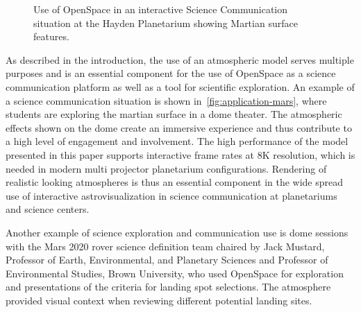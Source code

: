 \documentclass[journal]{vgtc}                %
\newcommand{\anderscomment}[1]{\textbf{[AY~} \textcolor{cyan}{#1} \textbf{~]}}
\newcommand{\chuckcomment}[1]{\textbf{[CH~} \textcolor{green}{#1} \textbf{~]}}
\begin{document}
\begin{figure}
 \centering
 \vspace*{-6mm}
 \caption{Use of OpenSpace in an interactive Science Communication situation at the Hayden Planetarium showing Martian surface features.}
 \label{fig:application-mars}
 \vspace*{-4mm} 
\end{figure}
As described in the introduction, the use of an atmospheric model serves multiple purposes and is an essential component for the use of OpenSpace as a science communication platform as well as a tool for scientific exploration. An example of a science communication situation is shown in~\autoref{fig:application-mars}, where students are exploring the martian surface in a dome theater. The atmospheric effects shown on the dome create an immersive experience and thus contribute to a high level of engagement and involvement. The high performance of the model presented in this paper supports interactive frame rates at 8K resolution, which is needed in modern multi projector planetarium configurations. Rendering of realistic looking atmospheres is thus an essential component in the wide spread use of interactive astrovisualization in science communication at planetariums and science centers. 

Another example of science exploration and communication use is dome sessions with the Mars 2020 rover science definition team chaired by Jack Mustard, Professor of Earth, Environmental, and Planetary Sciences and Professor of Environmental Studies, Brown University, who used OpenSpace for exploration and presentations of the criteria for landing spot selections. The atmosphere provided visual context when reviewing different potential landing sites.
\end{document}
